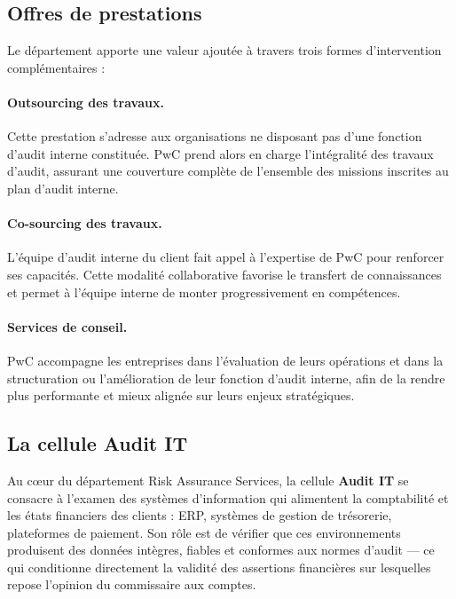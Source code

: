 \documentclass[12pt,a4paper,twoside]{report}
\begin{document}
\subsection{Offres de prestations}

Le département apporte une valeur ajoutée à travers trois formes d'intervention complémentaires :

\paragraph{Outsourcing des travaux.}
Cette prestation s'adresse aux organisations ne disposant pas d'une fonction d'audit interne constituée. PwC prend alors en charge l'intégralité des travaux d'audit, assurant une couverture complète de l'ensemble des missions inscrites au plan d'audit interne.

\paragraph{Co-sourcing des travaux.}
L'équipe d'audit interne du client fait appel à l'expertise de PwC pour renforcer ses capacités. Cette modalité collaborative favorise le transfert de connaissances et permet à l'équipe interne de monter progressivement en compétences.

\paragraph{Services de conseil.}
PwC accompagne les entreprises dans l'évaluation de leurs opérations et dans la structuration ou l'amélioration de leur fonction d'audit interne, afin de la rendre plus performante et mieux alignée sur leurs enjeux stratégiques.

\subsection{La cellule Audit IT}

Au cœur du département Risk Assurance Services, la cellule \textbf{Audit IT} se consacre à l'examen des systèmes d'information qui alimentent la comptabilité et les états financiers des clients : ERP, systèmes de gestion de trésorerie, plateformes de paiement. Son rôle est de vérifier que ces environnements produisent des données intègres, fiables et conformes aux normes d'audit --- ce qui conditionne directement la validité des assertions financières sur lesquelles repose l'opinion du commissaire aux comptes.
\end{document}
